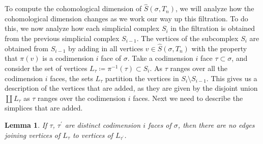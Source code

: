 \documentclass[12pt, letterpaper]{article}
\theoremstyle{plain}
\newtheorem{lem}[thm]{Lemma}
\theoremstyle{definition}
\begin{document}
\begin{figure}[h]
\captionsetup{margin=0.75in}
\label{fig:combinatorial-filtration}
\end{figure}

To compute the cohomological dimension of $\hat S(\sigma, T_n)$, we will analyze how the cohomological dimension changes as we work our way up this filtration. To do this, we now analyze how each simplicial complex $S_i$ in the filtration is obtained from the previous simplicial complex $S_{i-1}$. The vertices of the subcomplex  $S_{i}$ are obtained from $S_{i-1}$ by adding in all vertices $v\in \hat S(\sigma, T_n)$ with the property that $\pi(v)$ is a codimension $i$ face of $\sigma$. Take a codimension $i$ face $\tau \subset \sigma$, and consider the set of vertices $L_\tau\coloneqq\pi^{-1}(\tau) \subset S_i$. As $\tau$ ranges over all the codimension $i$ faces, the sets $L_\tau$ partition the vertices in $S_i \setminus S_{i-1}$. This gives us a description of the vertices that are added, as they are given by the disjoint union $\coprod L_\tau$ as $\tau$ ranges over the codimension $i$ faces. Next we need to describe the simplices that are added.
 
\begin{lem}\label{lem:chunks-dont-connect}
    If $\tau$, $\tau^\prime$ are distinct codimension $i$ faces of $\sigma$, then there are no edges joining vertices of $L_\tau$ to vertices of $L_{\tau^\prime}$.
\end{lem}
\end{document}
